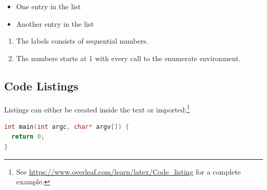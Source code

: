 \begin{itemize}
  \item One entry in the list
  \item Another entry in the list
\end{itemize}

\begin{enumerate}
  \item The labels consists of sequential numbers.
  \item The numbers starts at 1 with every call to the enumerate environment.
\end{enumerate}

\subsection{Code Listings}
\label{sec:intro:sub:code}

Listings can either be created inside the text or imported:\footnote{See \url{https://www.overleaf.com/learn/latex/Code_listing} for a complete example.}
\begin{lstlisting}[language=C]
int main(int argc, char* argv[]) {
  return 0;
}
\end{lstlisting}